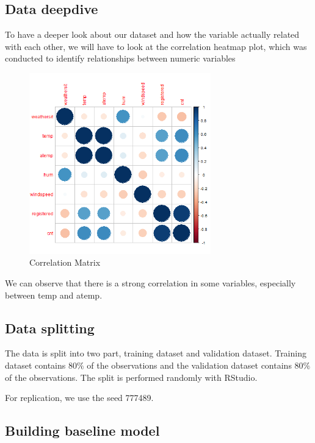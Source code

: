  


\subsection{Data deepdive}
To have a deeper look about our dataset and how the variable actually related with each other, we will have to look at the correlation heatmap plot, which was conducted to identify relationships between numeric variables

\begin{figure}[H]
\centering
\includegraphics[width=0.7\textwidth]{img/corplot.png}
\caption{Correlation Matrix}
\label{fig:Correlation_matrix_Q2_2}
\end{figure}

We can observe that there is a strong correlation in some variables, especially between temp and atemp.

\subsection{Data splitting}

The data is split into two part, training dataset and validation dataset. Training dataset contains 80$\%$ of the observations and the validation dataset contains 80$\%$ of the observations. The split is performed randomly with RStudio.

For replication, we use the seed 777489.

\subsection{Building baseline model}

